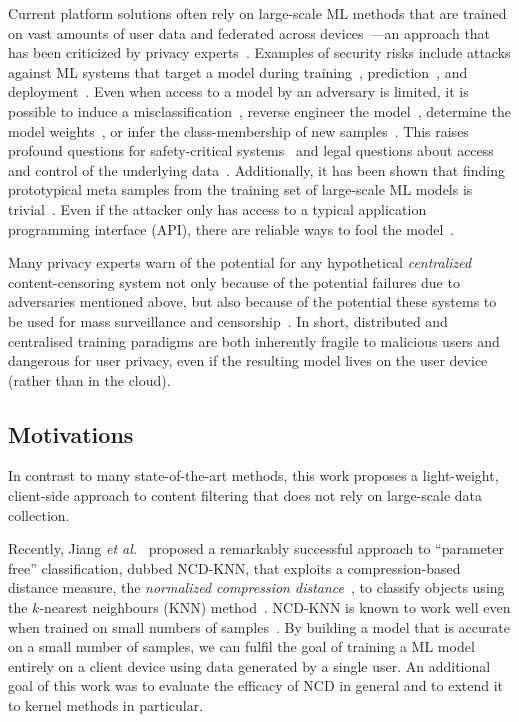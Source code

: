 \documentclass[preprint,12pt]{article}
\begin{document}
Current platform solutions often rely on large-scale ML methods that are trained on vast amounts of user data and federated across devices~\cite{apple_csam}---an approach that has been criticized by privacy experts~\cite{chat_control}.
Examples of security risks include attacks against ML systems that target a model during training~\cite{biggio_poisoning_2013}, prediction~\cite{biggio_evasion_2013,deepfool,carlini_towards_2017}, and deployment~\cite{distributed_attacks,santos2021universal}.
Even when access to a model by an adversary is limited, it is possible to induce a misclassification~\cite{hopskipjump}, reverse engineer the model~\cite{extraction_attack}, determine the model weights~\cite{jagielski2020high}, or infer the class-membership of new samples~\cite{bentley2020quantifying}.
This raises profound questions for safety-critical systems~\cite{meyers} and legal questions about access and control of the underlying data~\cite{mitrou2018data,marks2023ai}.
Additionally, it has been shown that finding prototypical meta samples from the training set of large-scale ML models is trivial~\cite{trashfire,meyers}. 
Even if the attacker only has access to a typical application programming interface (API), there are reliable ways to fool the model~\cite{hopskipjump}.

Many privacy experts warn of the potential for any hypothetical \textit{centralized} content-censoring system not only because of the potential failures due to adversaries mentioned above, but also because of the potential these systems to be used for mass surveillance and censorship~\cite{chat_control}.
In short, distributed and centralised training paradigms are both inherently fragile to malicious users and dangerous for user privacy, even if the resulting model lives on the user device (rather than in the cloud).


\subsection{Motivations}

In contrast to many state-of-the-art methods, this work proposes a light-weight, client-side approach to content filtering that does not rely on large-scale data collection.

Recently, Jiang \textit{et al.}~\cite{jiang2022less} proposed a remarkably successful approach to ``parameter free'' classification, dubbed NCD-KNN, that exploits a compress\-ion-based distance measure, the \textit{normalized compression distance}~\citep[NCD;][]{ncd}, to classify objects using the $k$-nearest neighbours (KNN) method~\cite{shalev2014understanding}.
NCD-KNN is known to work well even when trained on small numbers of samples~\cite{scilipoti2024strong}.
By building a model that is accurate on a small number of samples, we can fulfil the goal of training a ML model entirely on a client device using data generated by a single user.
An additional goal of this work was to evaluate the efficacy of NCD in general and to extend it to kernel methods in particular.
\end{document}
